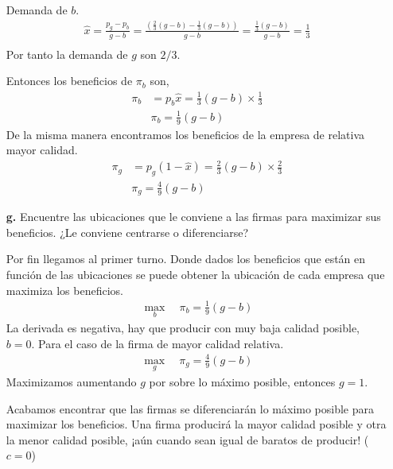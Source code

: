\documentclass{exam}
\begin{document}
\begin{itemize}
\begin{solution}
        Demanda de $b$.
        \begin{align*}
            \hat{x} = \frac{p_g-p_b}{g-b} = \frac{\left(\frac{2}{3}(g-b) -  \frac{1}{3}(g-b) \right)}{g-b} = \frac{\frac{1}{3}(g-b)}{g-b} = \frac{1}{3}\\
        \end{align*}
        Por tanto la demanda de $g$ son $2/3$.

        Entonces los beneficios de $\pi_b$ son,
        \begin{align*}
            \pi_b &= p_b \hat{x} = \frac{1}{3}(g-b) \times \frac{1}{3} \\
            & \boxed{\pi_b = \frac{1}{9} (g-b)}
        \end{align*}
        De la misma manera encontramos los beneficios de la empresa de relativa mayor calidad.
        \begin{align*}
            \pi_g &= p_g(1-\hat{x}) =\frac{2}{3}(g-b) \times \frac{2}{3}\\
            & \boxed{\pi_g = \frac{4}{9}(g-b)}
        \end{align*}
    \end{solution}
\item[\textbf{g.}] Encuentre las ubicaciones que le conviene a las firmas para maximizar sus beneficios. ¿Le conviene centrarse o diferenciarse? 
\begin{solution}
    Por fin llegamos al primer turno. Donde dados los beneficios que están en función de las ubicaciones se puede obtener la ubicación de cada empresa que maximiza los beneficios. 
    \begin{align*}
        \max_{b} \quad \pi_b = \frac{1}{9} (g-b)
    \end{align*}
    La derivada es negativa, hay que producir con muy baja calidad posible, $b = 0$. Para el caso de la firma de mayor calidad relativa. 
    \begin{align*}
        \max_g \quad \pi_g = \frac{4}{9}(g-b)
    \end{align*}
    Maximizamos aumentando $g$ por sobre lo máximo posible, entonces $g=1$.

    Acabamos encontrar que las firmas se diferenciarán lo máximo posible para maximizar los beneficios. Una firma producirá la mayor calidad posible y otra la menor calidad posible, ¡aún cuando sean igual de baratos de producir! ($c= 0$)
\end{solution}
\end{itemize}

\newpage
\end{document}
